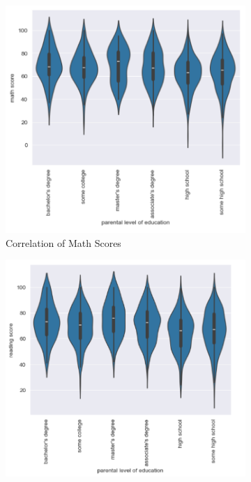 \documentclass[fleqn,10pt]{olplainarticle}
\begin{document}
\begin{figure}[h!]
    \centering
    \caption{Correlations of Parent Education to Student Subject Scores}
    \begin{subfigure}{0.3\textwidth}
    \includegraphics[width=\linewidth]{MathVsParent.png}
    \caption{Correlation of Math Scores}
    \label{fig:view}
    \end{subfigure}
    \begin{subfigure}{0.3\textwidth}
    \includegraphics[width=\linewidth]{ReadingVsParent.png}

\end{subfigure}
\end{figure}
\end{document}
